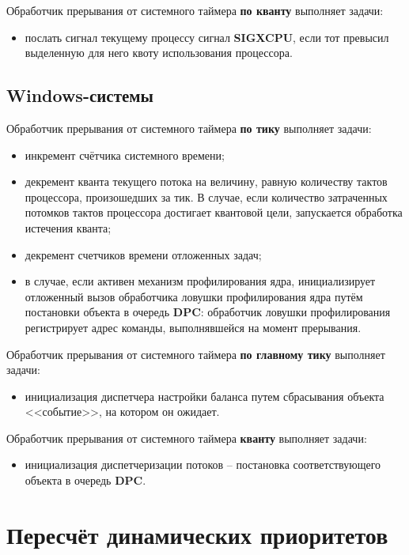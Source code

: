 Обработчик прерывания от системного таймера \textbf{по кванту} выполняет задачи:

\begin{itemize}
    \item послать сигнал текущему процессу сигнал \textbf{SIGXCPU}, если тот превысил выделенную для него квоту использования процессора.
\end{itemize}


\section{Windows-системы}

Обработчик прерывания от системного таймера \textbf{по тику} выполняет задачи:

\begin{itemize}
    \item инкремент счётчика системного времени;
    \item декремент кванта текущего потока на величину, равную количеству тактов процессора, произошедших за тик. В случае, если количество затраченных потомков тактов процессора достигает квантовой цели, запускается обработка истечения кванта;
    \item декремент счетчиков времени отложенных задач;
    \item в случае, если активен механизм профилирования ядра, инициализирует отложенный вызов обработчика ловушки профилирования ядра путём постановки объекта в очередь \textbf{DPC}: обработчик ловушки профилирования регистрирует адрес команды, выполнявшейся на момент прерывания.
\end{itemize}

Обработчик прерывания от системного таймера \textbf{по главному тику} выполняет задачи:

\begin{itemize}
    \item инициализация диспетчера настройки баланса путем сбрасывания объекта <<событие>>, на котором он ожидает.
\end{itemize}

Обработчик прерывания от системного таймера \textbf{кванту} выполняет задачи:

\begin{itemize}
    \item инициализация диспетчеризации потоков -- постановка соответствующего объекта в очередь \textbf{DPC}.
\end{itemize}

\chapter{Пересчёт динамических приоритетов}

